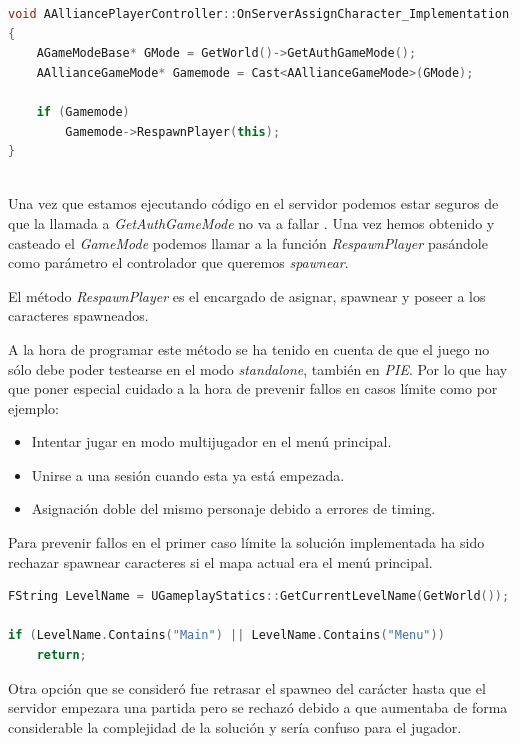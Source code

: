 \begin{lstlisting}[language=c++,caption={Código del método OnServerAssignCharacter},captionpos=b,label={lstAssignCodigo}]
void AAlliancePlayerController::OnServerAssignCharacter_Implementation()
{
	AGameModeBase* GMode = GetWorld()->GetAuthGameMode();
	AAllianceGameMode* Gamemode = Cast<AAllianceGameMode>(GMode);

	if (Gamemode)
		Gamemode->RespawnPlayer(this);
}
\end{lstlisting} \\

Una vez que estamos ejecutando código en el servidor podemos estar seguros de que la llamada a \textit{GetAuthGameMode} no va a fallar \cite{14}. Una vez hemos obtenido y casteado el \textit{GameMode} podemos llamar a la función \textit{RespawnPlayer} pasándole como parámetro el controlador que queremos \textit{spawnear}.

El método \textit{RespawnPlayer} es el encargado de asignar, spawnear y poseer a los caracteres spawneados.

A la hora de programar este método se ha tenido en cuenta de que el juego no sólo debe poder testearse en el modo \textit{standalone}, también en \textit{\ac{PIE}}. Por lo que hay que poner especial cuidado a la hora de prevenir fallos en casos límite como por ejemplo:

\begin{itemize}
	\item Intentar jugar en modo multijugador en el menú principal.
	\item Unirse a una sesión cuando esta ya está empezada.
	\item Asignación doble del mismo personaje debido a errores de timing.
\end{itemize}

Para prevenir fallos en el primer caso límite la solución implementada ha sido rechazar spawnear caracteres si el mapa actual era el menú principal.

\begin{lstlisting}[language=c++,caption={Rechazar el spawneo de caracteres en el menú principal},captionpos=b,label={lstRespawnNoMainMenu}]
FString LevelName = UGameplayStatics::GetCurrentLevelName(GetWorld());

if (LevelName.Contains("Main") || LevelName.Contains("Menu"))
	return;
\end{lstlisting}

Otra opción que se consideró fue retrasar el spawneo del carácter hasta que el servidor empezara una partida pero se rechazó debido a que aumentaba de forma considerable la complejidad de la solución y sería confuso para el jugador.

